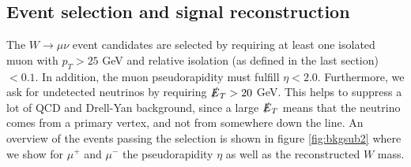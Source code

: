 \documentclass[11pt,a4paper]{article}
\begin{document}
\subsection{Event selection and signal reconstruction}
The $W \rightarrow \mu \nu$ event candidates are selected by requiring at least one isolated muon with $p_T > 25$ GeV and relative isolation (as defined in the last section) $ < 0.1$. In addition, the muon pseudorapidity must fulfill $\eta < 2.0$. Furthermore, we ask for undetected neutrinos by requiring $\slashed{E}_T > 20$ GeV. This helps to suppress a lot of QCD and Drell-Yan background, since a large $\slashed{E}_T$ means that the neutrino comes from a primary vertex, and not from somewhere down the line. An overview of the events passing the selection is shown in figure \ref{fig:bkgsub2} where we show for $\mu^+$ and $\mu^-$ the pseudorapidity $\eta$ as well as the reconstructed $W$ mass.
\end{document}
